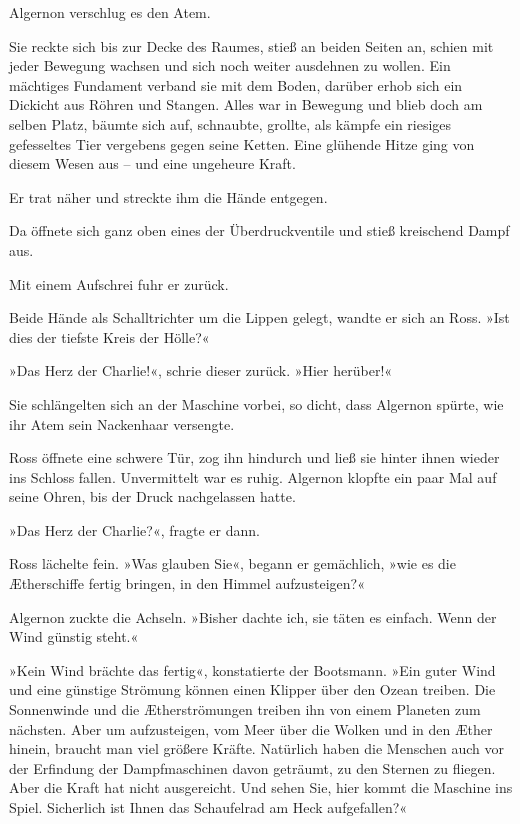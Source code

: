 \bigpar

Algernon verschlug es den Atem.

Sie reckte sich bis zur Decke des Raumes, stieß an beiden Seiten
an, schien mit jeder Bewegung wachsen und sich noch weiter
ausdehnen zu wollen. Ein mächtiges Fundament verband sie mit dem
Boden, darüber erhob sich ein Dickicht aus Röhren und Stangen.
Alles war in Bewegung und blieb doch am selben Platz, bäumte sich
auf, schnaubte, grollte, als kämpfe ein riesiges gefesseltes Tier
vergebens gegen seine Ketten. Eine glühende Hitze ging von diesem
Wesen aus – und eine ungeheure Kraft.

Er trat näher und streckte ihm die Hände entgegen.

Da öffnete sich ganz oben eines der Überdruckventile und stieß
kreischend Dampf aus.

Mit einem Aufschrei fuhr er zurück.

Beide Hände als Schalltrichter um die Lippen gelegt, wandte er sich
an Ross. »Ist dies der tiefste Kreis der Hölle?«

»Das Herz der Charlie!«, schrie dieser zurück. »Hier herüber!«

Sie schlängelten sich an der Maschine vorbei, so dicht, dass
Algernon spürte, wie ihr Atem sein Nackenhaar versengte.

Ross öffnete eine schwere Tür, zog ihn hindurch und ließ sie hinter
ihnen wieder ins Schloss fallen. Unvermittelt war es ruhig.
Algernon klopfte ein paar Mal auf seine Ohren, bis der Druck
nachgelassen hatte.

»Das Herz der Charlie?«, fragte er dann.

Ross lächelte fein. »Was glauben Sie«, begann er gemächlich, »wie
es die Ætherschiffe fertig bringen, in den Himmel aufzusteigen?«

Algernon zuckte die Achseln. »Bisher dachte ich, sie täten es
einfach. Wenn der Wind günstig steht.«

»Kein Wind brächte das fertig«, konstatierte der Bootsmann. »Ein
guter Wind und eine günstige Strömung können einen Klipper über den
Ozean treiben. Die Sonnenwinde und die Ætherströmungen treiben ihn
von einem Planeten zum nächsten. Aber um aufzusteigen, vom Meer
über die Wolken und in den Æther hinein, braucht man viel größere
Kräfte. Natürlich haben die Menschen auch vor der Erfindung der
Dampfmaschinen davon geträumt, zu den Sternen zu fliegen. Aber die
Kraft hat nicht ausgereicht. Und sehen Sie, hier kommt die Maschine
ins Spiel. Sicherlich ist Ihnen das Schaufelrad am Heck
aufgefallen?«

